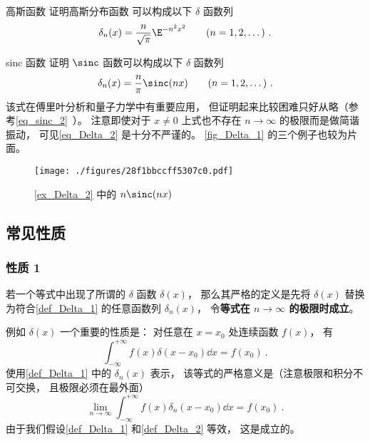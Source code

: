 \begin{exercise}{高斯函数}\label{exe_Delta_2}
证明高斯分布函数 可以构成以下 $\delta$ 函数列
\begin{equation}
\delta_n(x) = \frac{n}{\sqrt{\pi}} \E^{-{n ^2}x^2} \qquad (n = 1, 2, \dots)~.
\end{equation}
\end{exercise}

\begin{example}{sinc 函数}\label{ex_Delta_2}
证明 $\sinc$ 函数可以构成以下 $\delta$ 函数列
\begin{equation}\label{eq_Delta_10}
\delta_n(x) = \frac{n}{\pi}\sinc(n x) \qquad (n = 1, 2, \dots)~.
\end{equation}
该式在傅里叶分析和量子力学中有重要应用\cite{Arfken}， 但证明起来比较困难只好从略（参考\autoref{eq_sinc_2}~）。 注意即使对于 $x \ne 0$ 上式也不存在 $n\to\infty$ 的极限而是做简谐振动， 可见\autoref{eq_Delta_2} 是十分不严谨的。 \autoref{fig_Delta_1} 的三个例子也较为片面。
\end{example}
\begin{figure}[ht]
\centering
\texttt{[image: ./figures/28f1bbccff5307c0.pdf]}
\caption{\autoref{ex_Delta_2} 中的 $n\sinc(n x)$} \label{fig_Delta_2}
\end{figure}

\subsection{常见性质}
\subsubsection{性质 1}
若一个等式中出现了所谓的 $\delta$ 函数 $\delta(x)$， 那么其严格的定义是先将 $\delta(x)$ 替换为符合\autoref{def_Delta_1} 的任意函数列 $\delta_n(x)$， 令\textbf{等式在 $n\to\infty$ 的极限时成立}。

例如 $\delta(x)$ 一个重要的性质是： 对任意在 $x = x_0$ 处连续函数 $f(x)$， 有
\begin{equation}\label{eq_Delta_7}
\int_{-\infty}^{+\infty} f(x) \delta(x - x_0) \dd{x}= f(x_0)~.
\end{equation}
使用\autoref{def_Delta_1} 中的 $\delta_n(x)$ 表示， 该等式的严格意义是（注意极限和积分不可交换， 且极限必须在最外面）
\begin{equation}\label{eq_Delta_11}
\lim_{n\to\infty}\int_{-\infty}^{+\infty} f(x) \delta_n(x - x_0) \dd{x}= f(x_0)~.
\end{equation}
由于我们假设\autoref{def_Delta_1} 和\autoref{def_Delta_2} 等效， 这是成立的。

